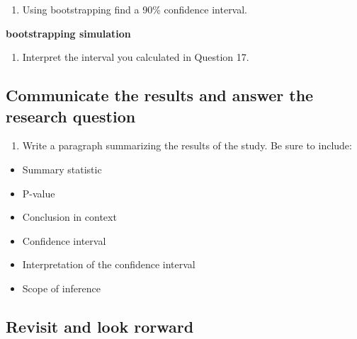 \documentclass[
]{report}
\providecommand{\tightlist}{%
  \setlength{\itemsep}{0pt}\setlength{\parskip}{0pt}}
\begin{document}
\vspace{1in}

\begin{enumerate}
\def\labelenumi{\arabic{enumi}.}
\setcounter{enumi}{16}
\tightlist
\item
  Using bootstrapping find a 90\% confidence interval.
\end{enumerate}

\textbf{bootstrapping simulation}

\begin{enumerate}
\def\labelenumi{\arabic{enumi}.}
\setcounter{enumi}{17}
\tightlist
\item
  Interpret the interval you calculated in Question 17.
\end{enumerate}

\vspace{1in}

\hypertarget{communicate-the-results-and-answer-the-research-question}{%
\subsection{Communicate the results and answer the research question}\label{communicate-the-results-and-answer-the-research-question}}

\begin{enumerate}
\def\labelenumi{\arabic{enumi}.}
\setcounter{enumi}{18}
\tightlist
\item
  Write a paragraph summarizing the results of the study. Be sure to include:
\end{enumerate}

\begin{itemize}
\item
  Summary statistic
\item
  P-value
\item
  Conclusion in context
\item
  Confidence interval
\item
  Interpretation of the confidence interval
\item
  Scope of inference
\end{itemize}

\vspace{3in}

\hypertarget{revisit-and-look-rorward}{%
\subsection{Revisit and look rorward}\label{revisit-and-look-rorward}}
\end{document}
